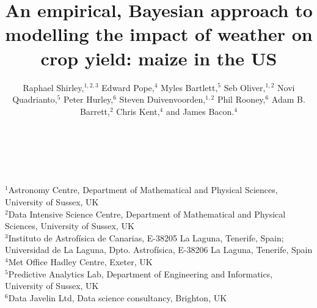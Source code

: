 \documentclass[12pt]{iopart}
\begin{document}
\label{firstpage}
\title[Bayesian crop yield prediction]{An empirical, Bayesian approach to modelling the impact of weather on crop yield: maize in the US}


\author[Shirley et al.]{
Raphael Shirley,$^{1,2,3}$ %
Edward Pope,$^{4}$
Myles Bartlett,$^{5}$
Seb Oliver,$^{1,2}$
Novi Quadrianto,$^{5}$
Peter Hurley,$^{6}$
Steven Duivenvoorden,$^{1,2}$
Phil Rooney,$^{6}$
Adam B. Barrett,$^{2}$
Chris Kent,$^{4}$
and James Bacon.$^{4}$
}

\\
\\
\parbox{\linewidth}{
{\scriptsize
$^{1}$Astronomy Centre, Department of Mathematical and Physical Sciences, University of Sussex, UK\\
$^{2}$Data Intensive Science Centre, Department of Mathematical and Physical Sciences, University of Sussex, UK\\
$^{3}$Instituto de Astrof\'{i}sica de Canarias, E-38205 La Laguna, Tenerife, Spain;\\ Universidad de La Laguna, Dpto. Astrof\'{i}sica, E-38206 La Laguna, Tenerife, Spain\\
$^{4}$Met Office Hadley Centre, Exeter, UK\\
$^{5}$Predictive Analytics Lab, Department of Engineering and Informatics, University of Sussex, UK\\
$^{6}$Data Javelin Ltd, Data science consultancy, Brighton, UK
}
}


\end{document}
